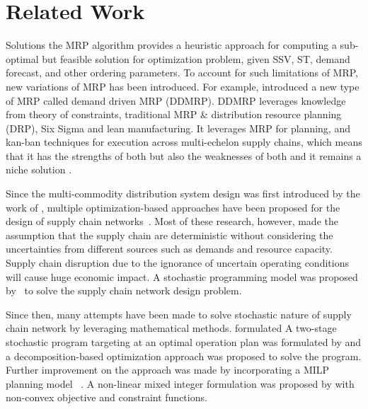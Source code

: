 \section{Related Work}
\label{section:related_work}

Solutions the MRP algorithm provides a heuristic approach for computing a sub-optimal but feasible solution for optimization problem, given SSV, ST, demand forecast, and other ordering parameters. To account for such limitations of MRP, new variations of MRP has been introduced. For example, \citet{ptak2011orlicky} introduced a new type of MRP called demand driven MRP (DDMRP). DDMRP leverages knowledge from theory of constraints, traditional MRP \& distribution resource planning (DRP), Six Sigma and lean manufacturing. It leverages MRP for planning, and kan-ban techniques for execution across multi-echelon supply chains, which means that it has the strengths of both but also the weaknesses of both and it remains a niche solution \citep{velasco2020applicability, smith2014demand}.

Since the multi-commodity distribution system design was first introduced by the work of \citet{inbook}, multiple optimization-based approaches have been proposed for the design of supply chain networks~\citep{AIKENS1985263, Geoffrion1995TwentyYO, VIDAL19971}. Most of these research, however, made the assumption that the supply chain are deterministic without considering the uncertainties from different sources such as demands and resource capacity. Supply chain disruption due to the ignorance of uncertain operating conditions will cause huge economic impact. A stochastic programming model was proposed by~\citet{SANTOSO200596} to solve the supply chain network design problem.

Since then, many attempts have been made to solve stochastic nature of supply chain network by leveraging mathematical methods. formulated A two-stage stochastic program targeting at an optimal operation plan was formulated by \citet{Ierapetritou1994NovelOA} and a decomposition-based optimization approach was proposed to solve the program. Further improvement on the approach was made by incorporating a MILP planning model~\citep{Gupta2000ATM} . A non-linear mixed integer formulation was proposed by \citet{Gupta2000ATM} with non-convex objective and constraint functions.

